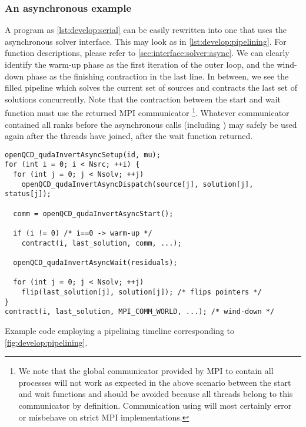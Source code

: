 \subsubsection{An asynchronous example}

A program as \cref{lst:develop:serial} can be easily rewritten into one that uses the asynchronous solver interface.
This may look as in \cref{lst:develop:pipelining}.
For function descriptions, please refer to \cref{sec:interface:solver:async}.
We can clearly identify the warm-up phase as the first iteration of the outer loop, and the wind-down phase as the finishing contraction in the last line.
In between, we see the filled pipeline which solves the current set of sources and contracts the last set of solutions concurrently.
Note that the contraction between the start and wait function must use the returned MPI communicator \footnote{We note that the global communicator  provided by MPI to contain all processes will not work as expected in the above scenario between the start and wait functions and should be avoided because all threads belong to this communicator by definition. Communication using  will most certainly error or misbehave on strict MPI implementations.}.
Whatever communicator contained all ranks before the asynchronous calls (including ) may safely be used again after the threads have joined, \ie after the wait function returned.
\begin{codelisting}
\begin{verbatim}
openQCD_qudaInvertAsyncSetup(id, mu);
for (int i = 0; i < Nsrc; ++i) {
  for (int j = 0; j < Nsolv; ++j)
    openQCD_qudaInvertAsyncDispatch(source[j], solution[j], status[j]);

  comm = openQCD_qudaInvertAsyncStart();

  if (i != 0) /* i==0 -> warm-up */
    contract(i, last_solution, comm, ...);

  openQCD_qudaInvertAsyncWait(residuals);

  for (int j = 0; j < Nsolv; ++j)
    flip(last_solution[j], solution[j]); /* flips pointers */
}
contract(i, last_solution, MPI_COMM_WORLD, ...); /* wind-down */
\end{verbatim}
\caption{Example code employing a pipelining timeline corresponding to \cref{fig:develop:pipelining}.}
\label{lst:develop:pipelining}
\end{codelisting}

